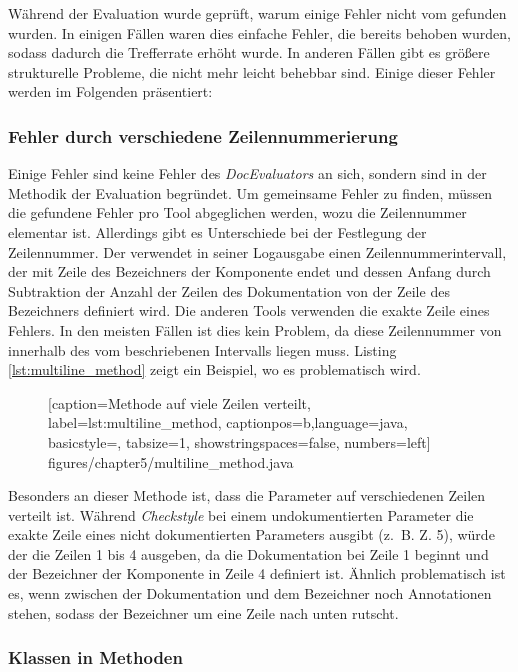 Während der Evaluation wurde geprüft, warum einige Fehler nicht vom \doceval gefunden wurden. In einigen Fällen waren dies einfache Fehler, die bereits behoben wurden, sodass dadurch die Trefferrate erhöht wurde. In anderen Fällen gibt es größere strukturelle Probleme, die nicht mehr leicht behebbar sind. Einige dieser Fehler werden im Folgenden präsentiert: 
\subsubsection{Fehler durch verschiedene Zeilennummerierung}

Einige Fehler sind keine Fehler des \textit{DocEvaluators} an sich, sondern sind in der Methodik der Evaluation begründet. Um gemeinsame Fehler zu finden, müssen die gefundene Fehler pro Tool abgeglichen werden, wozu die Zeilennummer elementar ist. Allerdings gibt es Unterschiede bei der Festlegung der Zeilennummer. Der \doceval verwendet in seiner Logausgabe einen Zeilennummerintervall, der mit Zeile des Bezeichners der Komponente endet und dessen Anfang durch Subtraktion der Anzahl der Zeilen des Dokumentation von der Zeile des Bezeichners definiert wird. Die anderen Tools verwenden die exakte Zeile eines Fehlers. In den meisten Fällen ist dies kein Problem, da diese Zeilennummer von \checkpmd innerhalb des vom \doceval beschriebenen Intervalls liegen muss. Listing \ref{lst:multiline_method} zeigt ein Beispiel, wo es problematisch wird.

		\begin{figure}[ht!]
			
			[caption={Methode auf viele Zeilen verteilt},
			label={lst:multiline_method},
			captionpos=b,language=java, basicstyle=\footnotesize, tabsize=1, showstringspaces=false,  numbers=left]
			{figures/chapter5/multiline_method.java}
		\end{figure}
Besonders an dieser Methode ist, dass die Parameter auf verschiedenen Zeilen verteilt ist. Während \textit{Checkstyle} bei einem undokumentierten Parameter die exakte Zeile eines nicht dokumentierten Parameters ausgibt (z.~B. Z. 5), würde der \doceval die Zeilen 1 bis 4 ausgeben, da die Dokumentation bei Zeile 1 beginnt und der Bezeichner der Komponente in Zeile 4 definiert ist. Ähnlich problematisch ist es, wenn zwischen der Dokumentation und dem Bezeichner noch Annotationen stehen, sodass der Bezeichner um eine Zeile nach unten rutscht.  

\subsubsection{Klassen in Methoden}

